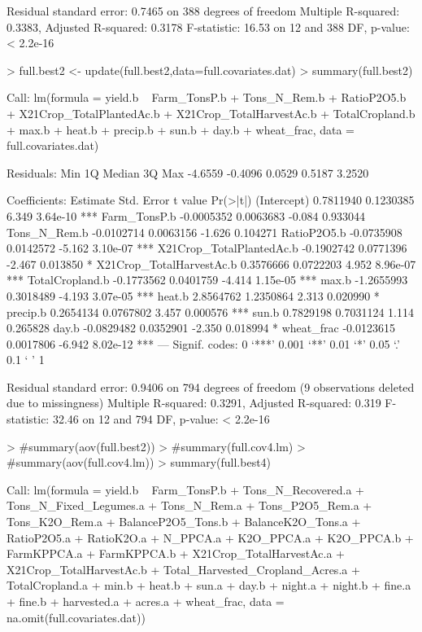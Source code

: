 \documentclass{report}
\begin{document}
\begin{Schunk}
\begin{Soutput}
Residual standard error: 0.7465 on 388 degrees of freedom
Multiple R-squared:  0.3383,	Adjusted R-squared:  0.3178 
F-statistic: 16.53 on 12 and 388 DF,  p-value: < 2.2e-16
\end{Soutput}
\begin{Sinput}
> full.best2 <- update(full.best2,data=full.covariates.dat)
> summary(full.best2)
\end{Sinput}
\begin{Soutput}
Call:
lm(formula = yield.b ~ Farm_TonsP.b + Tons_N_Rem.b + RatioP2O5.b + 
    X21Crop_TotalPlantedAc.b + X21Crop_TotalHarvestAc.b + TotalCropland.b + 
    max.b + heat.b + precip.b + sun.b + day.b + wheat_frac, data = full.covariates.dat)

Residuals:
    Min      1Q  Median      3Q     Max 
-4.6559 -0.4096  0.0529  0.5187  3.2520 

Coefficients:
                           Estimate Std. Error t value Pr(>|t|)    
(Intercept)               0.7811940  0.1230385   6.349 3.64e-10 ***
Farm_TonsP.b             -0.0005352  0.0063683  -0.084 0.933044    
Tons_N_Rem.b             -0.0102714  0.0063156  -1.626 0.104271    
RatioP2O5.b              -0.0735908  0.0142572  -5.162 3.10e-07 ***
X21Crop_TotalPlantedAc.b -0.1902742  0.0771396  -2.467 0.013850 *  
X21Crop_TotalHarvestAc.b  0.3576666  0.0722203   4.952 8.96e-07 ***
TotalCropland.b          -0.1773562  0.0401759  -4.414 1.15e-05 ***
max.b                    -1.2655993  0.3018489  -4.193 3.07e-05 ***
heat.b                    2.8564762  1.2350864   2.313 0.020990 *  
precip.b                  0.2654134  0.0767802   3.457 0.000576 ***
sun.b                     0.7829198  0.7031124   1.114 0.265828    
day.b                    -0.0829482  0.0352901  -2.350 0.018994 *  
wheat_frac               -0.0123615  0.0017806  -6.942 8.02e-12 ***
---
Signif. codes:  0 ‘***’ 0.001 ‘**’ 0.01 ‘*’ 0.05 ‘.’ 0.1 ‘ ’ 1

Residual standard error: 0.9406 on 794 degrees of freedom
  (9 observations deleted due to missingness)
Multiple R-squared:  0.3291,	Adjusted R-squared:  0.319 
F-statistic: 32.46 on 12 and 794 DF,  p-value: < 2.2e-16
\end{Soutput}
\begin{Sinput}
> #summary(aov(full.best2))
> #summary(full.cov4.lm)
> #summary(aov(full.cov4.lm))
> summary(full.best4)
\end{Sinput}
\begin{Soutput}
Call:
lm(formula = yield.b ~ Farm_TonsP.b + Tons_N_Recovered.a + Tons_N_Fixed_Legumes.a + 
    Tons_N_Rem.a + Tons_P2O5_Rem.a + Tons_K2O_Rem.a + BalanceP2O5_Tons.b + 
    BalanceK2O_Tons.a + RatioP2O5.a + RatioK2O.a + N_PPCA.a + 
    K2O_PPCA.a + K2O_PPCA.b + FarmKPPCA.a + FarmKPPCA.b + X21Crop_TotalHarvestAc.a + 
    X21Crop_TotalHarvestAc.b + Total_Harvested_Cropland_Acres.a + 
    TotalCropland.a + min.b + heat.b + sun.a + day.b + night.a + 
    night.b + fine.a + fine.b + harvested.a + acres.a + wheat_frac, 
    data = na.omit(full.covariates.dat))


\end{Soutput}
\end{Schunk}
\end{document}
